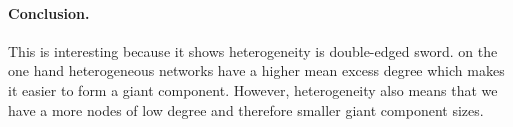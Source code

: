 \paragraph{Conclusion.}This is interesting because it shows heterogeneity is double-edged sword. on the one hand heterogeneous networks have a higher mean excess degree which makes it easier to form a giant component. However, heterogeneity also means that we have a more nodes of low degree and therefore smaller giant component sizes.   

